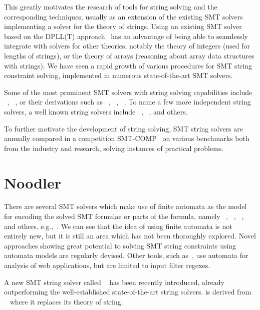 This greatly motivates the research of tools for string solving and the corresponding techniques, usually as an extension of the existing SMT solvers implementing a solver for the theory of strings.
Using an existing SMT solver based on the DPLL(T) approach~\cite{dpll06} has an advantage of being able to seamlessly integrate with solvers for other theories, notably the theory of integers (used for lengths of strings), or the theory of arrays (reasoning about array data structures with strings).
We have seen a rapid growth of various procedures for SMT string constraint solving, implemented in numerous state-of-the-art SMT solvers.

Some of the most prominent SMT solvers
with string solving capabilities include \cvcv~\cite{cvc5}, \ziii~\cite{z3}, or their derivations such as \trau~\cite{Trau}, \ziiistriiire~\cite{Z3str3RE, BerzishDGKMMN23}, \ziiistriv~\cite{Z3str4}.
To name a few more independent string solvers, a well known string solvers include \ostrich~\cite{AnthonyComplex2019}, \norn~\cite{Norn}, and others.

To further motivate the development of string solving, SMT string solvers are annually compared in a competition SMT-COMP~\cite{smt_comp} on various benchmarks both from the industry and research, solving instances of practical problems.

\section{Noodler}
There are several SMT solvers which make use of finite automata as the model for encoding the solved SMT formulae or parts of the formula, namely \ziiistriiire~\cite{Z3str3RE}, \trau~\cite{Trau}, \norn~\cite{Norn}, and others, e.g.,~\cite{AnthonyComplex2019}.
We can see that the idea of using finite automata is not entirely new, but it is still an area which has not been thoroughly explored.
Novel approaches showing great potential to solving SMT string constraints using automata models are regularly devised.
Other tools, such as~\cite{black_ostrich}, use automata for analysis of web applications, but are limited to input filter regexes.

A new SMT string solver called \noodler~\cite{fm23_equations_synergy_regular_constraints_DBLP:conf/fm/BlahoudekCCHHLS23, oopsla23_stabilization_DBLP:journals/pacmpl/ChenCHHLS23,tacas24_noodler_10.1007/978-3-031-57246-3_2} has been recently introduced, already outperforming the well-established state-of-the-art string solvers.
\noodler is derived from \ziii~\cite{z3} where it replaces its theory of string.

